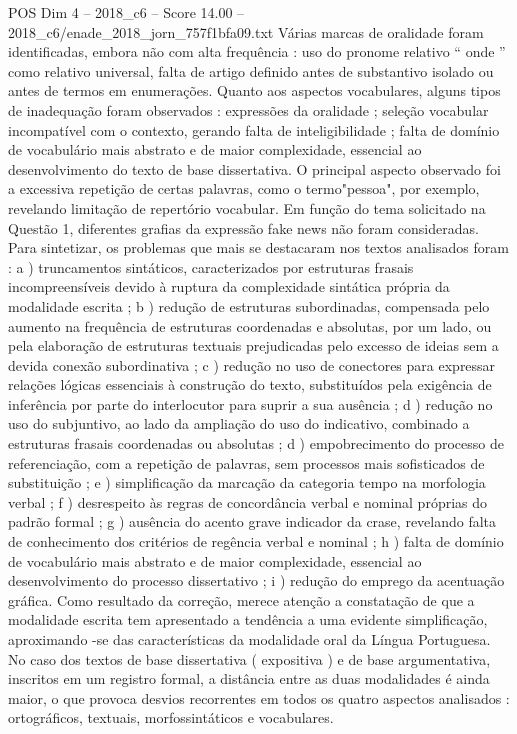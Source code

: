\begin{textsample}{POS Dim 4 – 2018\_c6 – Score 14.00 – 2018\_c6/enade\_2018\_jorn\_757f1bfa09.txt}
Várias marcas de oralidade foram identificadas, embora não com alta frequência : uso do pronome relativo “ onde ” como relativo universal, falta de artigo definido antes de substantivo isolado ou antes de termos em enumerações.
Quanto aos aspectos vocabulares, alguns tipos de inadequação foram observados : expressões da oralidade ; seleção vocabular incompatível com o contexto, gerando falta de inteligibilidade ; falta de domínio de vocabulário mais abstrato e de maior complexidade, essencial ao desenvolvimento do texto de base dissertativa.
O principal aspecto observado foi a excessiva repetição de certas palavras, como o termo"pessoa", por exemplo, revelando limitação de repertório vocabular.
Em função do tema solicitado na Questão 1, diferentes grafias da expressão fake news não foram consideradas.
Para sintetizar, os problemas que mais se destacaram nos textos analisados foram : a ) truncamentos sintáticos, caracterizados por estruturas frasais incompreensíveis devido à ruptura da complexidade sintática própria da modalidade escrita ; b ) redução de estruturas subordinadas, compensada pelo aumento na frequência de estruturas coordenadas e absolutas, por um lado, ou pela elaboração de estruturas textuais prejudicadas pelo excesso de ideias sem a devida conexão subordinativa ; c ) redução no uso de conectores para expressar relações lógicas essenciais à construção do texto, substituídos pela exigência de inferência por parte do interlocutor para suprir a sua ausência ; d ) redução no uso do subjuntivo, ao lado da ampliação do uso do indicativo, combinado a estruturas frasais coordenadas ou absolutas ; d ) empobrecimento do processo de referenciação, com a repetição de palavras, sem processos mais sofisticados de substituição ; e ) simplificação da marcação da categoria tempo na morfologia verbal ; f ) desrespeito às regras de concordância verbal e nominal próprias do padrão formal ; g ) ausência do acento grave indicador da crase, revelando falta de conhecimento dos critérios de regência verbal e nominal ; h ) falta de domínio de vocabulário mais abstrato e de maior complexidade, essencial ao desenvolvimento do processo dissertativo ; i ) redução do emprego da acentuação gráfica.
Como resultado da correção, merece atenção a constatação de que a modalidade escrita tem apresentado a tendência a uma evidente simplificação, aproximando -se das características da modalidade oral da Língua Portuguesa.
No caso dos textos de base dissertativa ( expositiva ) e de base argumentativa, inscritos em um registro formal, a distância entre as duas modalidades é ainda maior, o que provoca desvios recorrentes em todos os quatro aspectos analisados : ortográficos, textuais, morfossintáticos e vocabulares.

\end{textsample}

